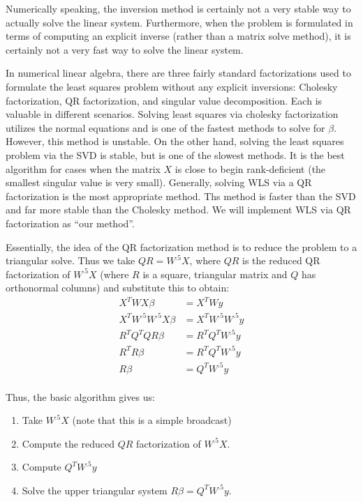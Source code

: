 \documentclass[12pt]{article}
\newenvironment{problem}[2][Exercise]{\begin{trivlist}
\item[\hskip \labelsep {\bfseries #1}\hskip \labelsep {\bfseries #2.}]}{\end{trivlist}}
\begin{document}
\begin{problem}{B}
Numerically speaking, the inversion method is  certainly not a very stable way to actually solve the linear system. 
Furthermore, when the problem is formulated in terms of computing an explicit inverse (rather than a matrix solve method), it is certainly not a very fast way to solve the linear system.

In numerical linear algebra, there are three fairly standard factorizations used to formulate the least squares problem without any explicit inversions: Cholesky factorization, QR factorization, and singular value decomposition.
Each is valuable in different scenarios. 
Solving least squares via cholesky factorization utilizes the normal equations and is one of the fastest methods to solve for $\beta$.
However, this method is unstable.
On the other hand, solving the least squares problem via the SVD is stable, but is one of the slowest methods.
It is the best algorithm for  cases when the matrix $X$ is close to begin rank-deficient (the smallest singular value is very small).
Generally, solving WLS via a QR factorization is the most appropriate method.
Ths method is faster than the SVD and far more stable than the Cholesky method.
We will implement WLS via QR factorization as ``our method''.

Essentially, the idea of the QR factorization method is to reduce the problem to a triangular solve.
Thus we take $QR = W^{.5}X$, where $QR$ is the reduced QR factorization of $W^.5X$ (where $R$ is a square, triangular matrix and $Q$ has orthonormal columns) and substitute this to obtain:
\begin{align*}
X^TWX\beta &= X^T Wy\\
X^TW^{.5}W^{.5}X\beta &= X^T W^{.5}W^{.5}y\\
R^TQ^TQR\beta &= R^TQ^TW^{.5}y\\
R^TR\beta&=R^TQ^TW^{.5}y\\
R\beta &= Q^TW^{.5}y\\
\end{align*}

Thus, the basic algorithm gives us:
\begin{enumerate}
    \item Take $W^{.5}X$ (note that this is a simple broadcast)
    \item Compute the reduced $QR$ factorization of $W^.5X$.
    \item Compute $Q^TW^{.5}y$ 
    \item Solve the upper triangular system $R\beta = Q^TW^{.5}y$.
\end{enumerate}
\end{problem}
\end{document}

